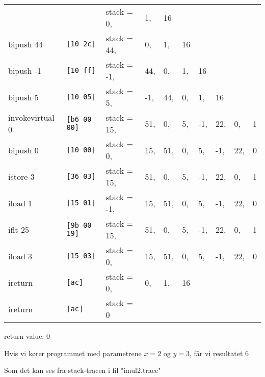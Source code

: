 \documentclass[12pt,a4paper]{article}
\begin{document}
\begin{tabular}{llllllllll}
                &                    & stack = 0,& 1,& 16 \\
bipush 44       & \texttt{[10 2c]   }& stack = 44,& 0,& 1,& 16 \\
bipush -1       & \texttt{[10 ff]   }& stack = -1,& 44,& 0,& 1,& 16 \\
bipush 5        & \texttt{[10 05]   }& stack = 5,& -1,& 44,& 0,& 1,& 16 \\
invokevirtual 0 & \texttt{[b6 00 00]}& stack = 15,& 51,& 0,& 5,& -1,& 22,& 0,& 1 \\
bipush 0        & \texttt{[10 00]   }& stack = 0,& 15,& 51,& 0,& 5,& -1,& 22,& 0 \\
istore 3        & \texttt{[36 03]   }& stack = 15,& 51,& 0,& 5,& -1,& 22,& 0,& 1 \\
iload 1         & \texttt{[15 01]   }& stack = -1,& 15,& 51,& 0,& 5,& -1,& 22,& 0 \\
iflt 25         & \texttt{[9b 00 19]}& stack = 15,& 51,& 0,& 5,& -1,& 22,& 0,& 1 \\
iload 3         & \texttt{[15 03]   }& stack = 0,& 15,& 51,& 0,& 5,& -1,& 22,& 0 \\
ireturn         & \texttt{[ac]      }& stack = 0,& 0,& 1,& 16 \\
ireturn         & \texttt{[ac]      }& stack = 0
\end{tabular}

return value: $0$


Hvis vi kører programmet med parametrene $x=2$ og $y=3$, får vi resultatet $6$

Som det kan ses fra stack-tracen i fil "imul2.trace"
\end{document}
